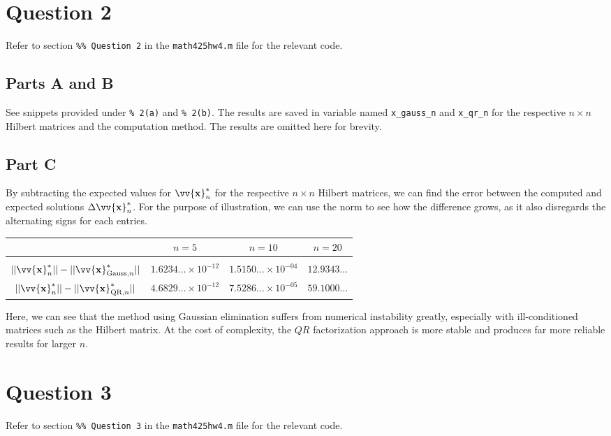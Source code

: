 \documentclass[12pt]{article}
\newcommand{\vect}[1]{\vv{\mathbf{#1}}}
\newcommand{\code}[1]{\texttt{#1}}
\begin{document}
\section*{Question 2}

Refer to section \code{\%\% Question 2} in the \code{math425hw4.m} file for the relevant code.

\subsection*{Parts A and B}

See snippets provided under \code{\% 2(a)} and \code{\% 2(b)}. The results are saved in variable named \verb|x_gauss_n| and \verb|x_qr_n| for the respective $n\times n$ Hilbert matrices and the computation method. The results are omitted here for brevity.

\subsection*{Part C}

By subtracting the expected values for $\vect{x}^*_n$ for the respective $n\times n$ Hilbert matrices, we can find the error between the computed and expected solutions $\Delta\vect{x}^*_n$. For the purpose of illustration, we can use the norm to see how the difference grows, as it also disregards the alternating signs for each entries.

\begin{table}[H]
    \centering
    \begin{tabular}{cccc}
         & $n=5$ & $n=10$ & $n=20$ \\
        \hline \\
       $||\vect{x}^*_n|| - ||\vect{x}^*_{\text{Gauss}, n}||$  & $1.6234\ldots\times10^{-12}$ & $1.5150\ldots\times10^{-04}$ & $12.9343\ldots$\\
       $||\vect{x}^*_n|| - ||\vect{x}^*_{\text{QR}, n}||$ & $4.6829\ldots\times10^{-12}$ & $7.5286\ldots\times10^{-05}$ & $59.1000\ldots$ \\
    \end{tabular}
\end{table}

Here, we can see that the method using Gaussian elimination suffers from numerical instability greatly, especially with ill-conditioned matrices such as the Hilbert matrix. At the cost of complexity, the $QR$ factorization approach is more stable and produces far more reliable results for larger $n$.

\section*{Question 3}

Refer to section \code{\%\% Question 3} in the \code{math425hw4.m} file for the relevant code.
\end{document}

